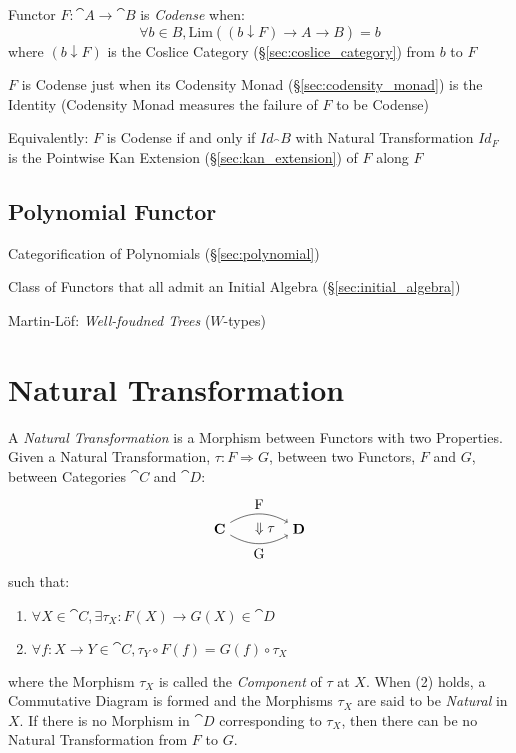 Functor $F : \cat{A} \rightarrow \cat{B}$ is \emph{Codense} when:
\[
  \forall b \in B,
  \mathrm{Lim}((b \downarrow F) \rightarrow A \rightarrow B) = b
\]
where $(b \downarrow F)$ is the Coslice Category
(\S\ref{sec:coslice_category}) from $b$ to $F$

$F$ is Codense just when its Codensity Monad
(\S\ref{sec:codensity_monad}) is the Identity (Codensity Monad
measures the failure of $F$ to be Codense)

Equivalently: $F$ is Codense if and only if $Id_\cat{B}$ with Natural
Transformation $Id_F$ is the Pointwise Kan Extension
(\S\ref{sec:kan_extension}) of $F$ along $F$



\subsection{Polynomial Functor} \label{sec:polynomial_functor}

Categorification of Polynomials (\S\ref{sec:polynomial})

Class of Functors that all admit an Initial Algebra
(\S\ref{sec:initial_algebra})

Martin-L\"of: \emph{Well-foudned Trees} ($W$-types) %



\section{Natural Transformation}\label{sec:natural_transformation}

A \emph{Natural Transformation} is a Morphism between Functors with
two Properties. Given a Natural Transformation, $\tau : F \Rightarrow
G$, between two Functors, $F$ and $G$, between Categories $\cat{C}$
and $\cat{D}$:
\[
  \begin{tikzpicture}
    \node (C) at (-1,0) {$\cat{C}$};
    \node (D) at (1,0) {$\cat{D}$};
    \node (T) at (0,0) {$\;\;\;\Downarrow\tau$};
    \draw[->,bend left] (C) to node [above] {F} (D);
    \draw[->,bend right] (C) to node [below] {G} (D);
  \end{tikzpicture}
\]
such that:
\begin{enumerate}
  \item $\forall X \in \cat{C},
    \exists \tau_X : F(X) \rightarrow G(X) \in \cat{D}$
  \item $\forall f : X \rightarrow Y \in \cat{C},
    \tau_Y \circ F(f) = G(f) \circ \tau_X$
\end{enumerate}
where the Morphism $\tau_X$ is called the \emph{Component} of $\tau$
at $X$. When (2) holds, a Commutative Diagram is formed and the
Morphisms $\tau_X$ are said to be \emph{Natural} in $X$. If there is
no Morphism in $\cat{D}$ corresponding to $\tau_X$, then there can
be no Natural Transformation from $F$ to $G$.

